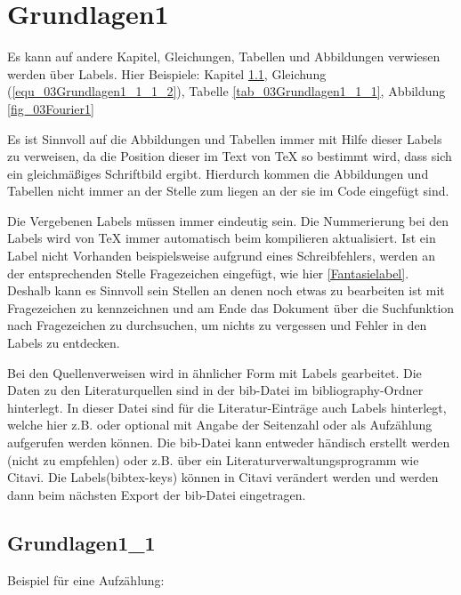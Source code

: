 \section{Grundlagen1}
Es kann auf andere Kapitel, Gleichungen, Tabellen und Abbildungen verwiesen werden über Labels. Hier Beispiele: Kapitel \ref{ch_03Grundlagen1_1}, Gleichung (\ref{equ_03Grundlagen1_1_1_2}),
Tabelle \ref{tab_03Grundlagen1_1_1},
Abbildung \ref{fig_03Fourier1}

Es ist Sinnvoll auf die Abbildungen und Tabellen immer mit Hilfe dieser Labels zu verweisen, da die Position dieser im Text von TeX so bestimmt wird, dass sich ein gleichmäßiges Schriftbild ergibt. Hierdurch kommen die Abbildungen und Tabellen nicht immer an der Stelle zum liegen an der sie im Code eingefügt sind.

Die Vergebenen Labels müssen immer eindeutig sein. Die Nummerierung bei den Labels wird von TeX immer automatisch beim kompilieren aktualisiert. Ist ein Label nicht Vorhanden beispielsweise aufgrund eines Schreibfehlers, werden an der entsprechenden Stelle Fragezeichen eingefügt, wie hier \ref{Fantasielabel}. Deshalb kann es Sinnvoll sein Stellen an denen noch etwas zu bearbeiten ist mit Fragezeichen zu kennzeichnen und am Ende das Dokument über die Suchfunktion nach Fragezeichen zu durchsuchen, um nichts zu vergessen und Fehler in den Labels zu entdecken.

Bei den Quellenverweisen wird in ähnlicher Form mit Labels gearbeitet. Die Daten zu den Literaturquellen sind in der bib-Datei im bibliography-Ordner hinterlegt. In dieser Datei sind für die Literatur-Einträge auch Labels hinterlegt, welche hier z.B. \cite{Binder.2017} oder optional mit Angabe der Seitenzahl \cite[S.666]{Binder.2017} oder als Aufzählung \cite{Bianchi.2009, Kerdsup.2014, Sanada.2003, Howard.2015} aufgerufen werden können. Die bib-Datei kann entweder händisch erstellt werden (nicht zu empfehlen) oder z.B. über ein Literaturverwaltungsprogramm wie Citavi. Die Labels(bibtex-keys) können in Citavi verändert werden und werden dann beim nächsten Export der bib-Datei eingetragen.


\subsection{Grundlagen1\_1}
\label{ch_03Grundlagen1_1}
Beispiel für eine Aufzählung:

